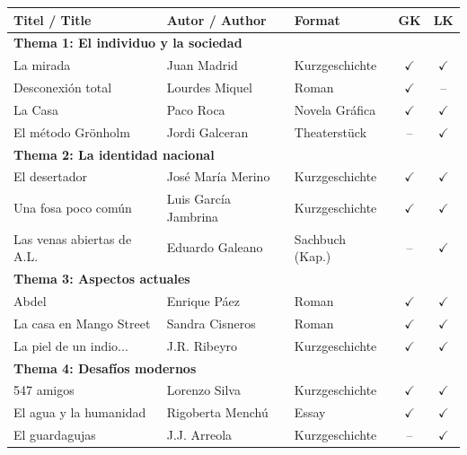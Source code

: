 \documentclass[10pt,a4paper]{article}
\begin{document}
\begin{center}
\scriptsize
\begin{tabular}{|p{3.8cm}|p{2.8cm}|p{2cm}|c|c|}
\hline
\rowcolor{lightgray}
\textbf{Titel / Title} & \textbf{Autor / Author} & \textbf{Format} & \textbf{GK} & \textbf{LK} \\
\hline
\multicolumn{5}{|l|}{\cellcolor{lightred}\textbf{Thema 1: El individuo y la sociedad}} \\
\hline
La mirada & Juan Madrid & Kurzgeschichte & $\checkmark$ & $\checkmark$ \\
Desconexión total & Lourdes Miquel & Roman & $\checkmark$ & -- \\
La Casa & Paco Roca & Novela Gráfica & $\checkmark$ & $\checkmark$ \\
El método Grönholm & Jordi Galceran & Theaterstück & -- & $\checkmark$ \\
\hline
\multicolumn{5}{|l|}{\cellcolor{lightred}\textbf{Thema 2: La identidad nacional}} \\
\hline
El desertador & José María Merino & Kurzgeschichte & $\checkmark$ & $\checkmark$ \\
Una fosa poco común & Luis García Jambrina & Kurzgeschichte & $\checkmark$ & $\checkmark$ \\
Las venas abiertas de A.L. & Eduardo Galeano & Sachbuch (Kap.) & -- & $\checkmark$ \\
\hline
\multicolumn{5}{|l|}{\cellcolor{lightred}\textbf{Thema 3: Aspectos actuales}} \\
\hline
Abdel & Enrique Páez & Roman & $\checkmark$ & $\checkmark$ \\
La casa en Mango Street & Sandra Cisneros & Roman & $\checkmark$ & $\checkmark$ \\
La piel de un indio... & J.R. Ribeyro & Kurzgeschichte & $\checkmark$ & $\checkmark$ \\
\hline
\multicolumn{5}{|l|}{\cellcolor{lightred}\textbf{Thema 4: Desafíos modernos}} \\
\hline
547 amigos & Lorenzo Silva & Kurzgeschichte & $\checkmark$ & $\checkmark$ \\
El agua y la humanidad & Rigoberta Menchú & Essay & $\checkmark$ & $\checkmark$ \\
El guardagujas & J.J. Arreola & Kurzgeschichte & -- & $\checkmark$ \\
\hline
\end{tabular}
\end{center}

\vspace{4mm}
\end{document}
